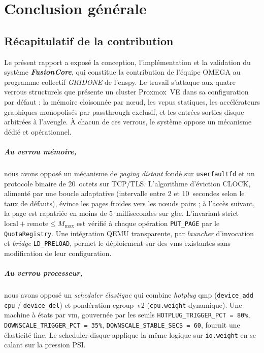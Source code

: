 \chapter*{Conclusion générale}

\section*{Récapitulatif de la contribution}

Le présent rapport a exposé la conception, l'implémentation et la validation du système \textbf{\emph{FusionCore}}, qui constitue la contribution de l'équipe OMEGA au programme collectif \emph{GRIDONE} de l'\acrshort{enspy}. Le travail s'attaque aux quatre verrous structurels que présente un cluster Proxmox~VE dans sa configuration par défaut : la mémoire cloisonnée par nœud, les \acrshort{vcpu}s statiques, les accélérateurs graphiques monopolisés par passthrough exclusif, et les entrées-sorties disque arbitrées à l'aveugle. À chacun de ces verrous, le système oppose un mécanisme dédié et opérationnel.

\paragraph{Au verrou mémoire,} nous avons opposé un mécanisme de \emph{paging distant} fondé sur \texttt{userfaultfd} et un protocole binaire de 20~octets sur TCP/TLS. L'algorithme d'éviction CLOCK, alimenté par une boucle adaptative (intervalle entre 2 et 10~secondes selon le taux de défauts), évince les pages froides vers les nœuds pairs ; à l'accès suivant, la page est rapatriée en moins de 5~millisecondes sur \acrshort{gbe}. L'invariant strict $\text{local} + \text{remote} \le M_{\max}$ est vérifié à chaque opération \texttt{PUT\_PAGE} par le \texttt{QuotaRegistry}. Une intégration QEMU transparente, par \emph{launcher} d'invocation et \emph{bridge} \texttt{LD\_PRELOAD}, permet le déploiement sur des \acrshort{vm}s existantes sans modification de leur configuration.

\paragraph{Au verrou processeur,} nous avons opposé un \emph{scheduler élastique} qui combine \emph{hotplug} \acrshort{qmp} (\texttt{device\_add cpu} / \texttt{device\_del}) et pondération cgroup~v2 (\texttt{cpu.weight} dynamique). Une machine à états par \acrshort{vm}, gouvernée par les seuils \texttt{HOTPLUG\_TRIGGER\_PCT~=~80\%}, \texttt{DOWNSCALE\_TRIGGER\_PCT~=~35\%}, \texttt{DOWNSCALE\_STABLE\_SECS~=~60}, fournit une élasticité fine. Le scheduler disque applique la même logique sur \texttt{io.weight} en se calant sur la pression PSI.

